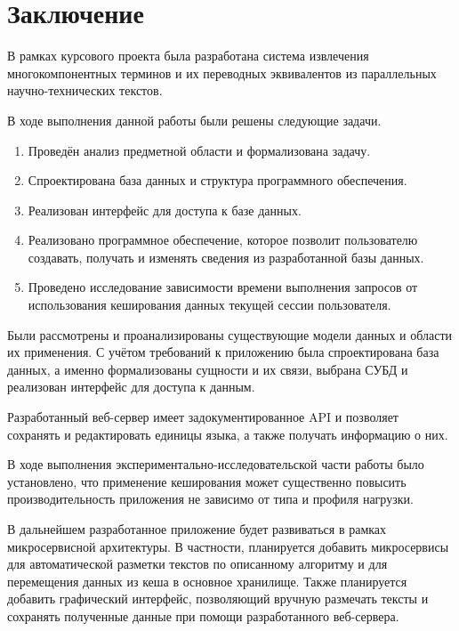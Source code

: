 \section*{Заключение}

В рамках курсового проекта была разработана система извлечения многокомпонентных терминов и их переводных эквивалентов из параллельных научно-технических текстов.

В ходе выполнения данной работы были решены следующие задачи.

\begin{enumerate}[label*=\arabic*.]
	\item Проведён анализ предметной области и формализована задачу.
	\item Спроектирована база данных и структура программного обеспечения.
	\item Реализован интерфейс для доступа к базе данных. 
	\item Реализовано программное обеспечение, которое позволит пользователю создавать, получать и изменять сведения из разработанной базы данных. 
	\item Проведено исследование зависимости времени выполнения запросов от использования кеширования данных текущей сессии пользователя.
\end{enumerate}


Были рассмотрены и проанализированы существующие модели данных и области их применения. %
С учётом требований к приложению была спроектирована база данных, а именно формализованы сущности и их связи, выбрана СУБД и реализован интерфейс для доступа к данным.

Разработанный веб-сервер имеет задокументированное API и позволяет сохранять и редактировать единицы языка, а также получать информацию о них.

В ходе выполнения экспериментально-исследовательской части работы было установлено, что применение кеширования может существенно повысить производительность приложения не зависимо от типа и профиля нагрузки.


В дальнейшем разработанное приложение будет развиваться в рамках микросервисной архитектуры. В частности, планируется добавить микросервисы для автоматической разметки текстов по описанному алгоритму и для перемещения данных из кеша в основное хранилище. Также планируется добавить графический интерфейс, позволяющий вручную размечать тексты и сохранять полученные данные при помощи разработанного веб-сервера.

